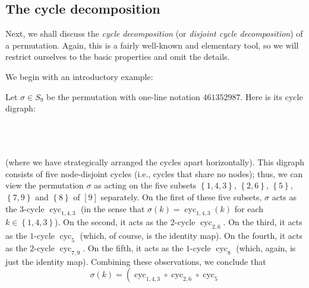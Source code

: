 \subsection{The cycle decomposition}

Next, we shall discuss the \emph{cycle decomposition} (or \emph{disjoint cycle
decomposition}) of a permutation. Again, this is a fairly well-known and
elementary tool, so we will restrict ourselves to the basic properties and
omit the details.

We begin with an introductory example:

\begin{example}
\label{exa.perm.dcd.1}Let $\sigma\in S_{9}$ be the permutation with one-line
notation $461352987$. Here is its cycle digraph:%
\[%
\qquad\qquad%
\qquad%
\raisebox{8ex}{
}%
\qquad%
\qquad%
\raisebox{8ex}{
}%
\]
(where we have strategically arranged the cycles apart horizontally). This
digraph consists of five node-disjoint cycles (i.e., cycles that share no
nodes); thus, we can view the permutation $\sigma$ as acting on the five
subsets $\left\{  1,4,3\right\}  $, $\left\{  2,6\right\}  $, $\left\{
5\right\}  $, $\left\{  7,9\right\}  $ and $\left\{  8\right\}  $ of $\left[
9\right]  $ separately. On the first of these five subsets, $\sigma$ acts as
the $3$-cycle $\operatorname*{cyc}\nolimits_{1,4,3}$ (in the sense that
$\sigma\left(  k\right)  =\operatorname*{cyc}\nolimits_{1,4,3}\left(
k\right)  $ for each $k\in\left\{  1,4,3\right\}  $). On the second, it acts
as the $2$-cycle $\operatorname*{cyc}\nolimits_{2,6}$. On the third, it acts
as the $1$-cycle $\operatorname*{cyc}\nolimits_{5}$ (which, of course, is the
identity map). On the fourth, it acts as the $2$-cycle $\operatorname*{cyc}%
\nolimits_{7,9}$. On the fifth, it acts as the $1$-cycle $\operatorname*{cyc}%
\nolimits_{8}$ (which, again, is just the identity map). Combining these
observations, we conclude that%
\[
\sigma\left(  k\right)  =\left(  \operatorname*{cyc}\nolimits_{1,4,3}%
\circ\operatorname*{cyc}\nolimits_{2,6}\circ\operatorname*{cyc}\nolimits_{5}%
\]
\end{example}
